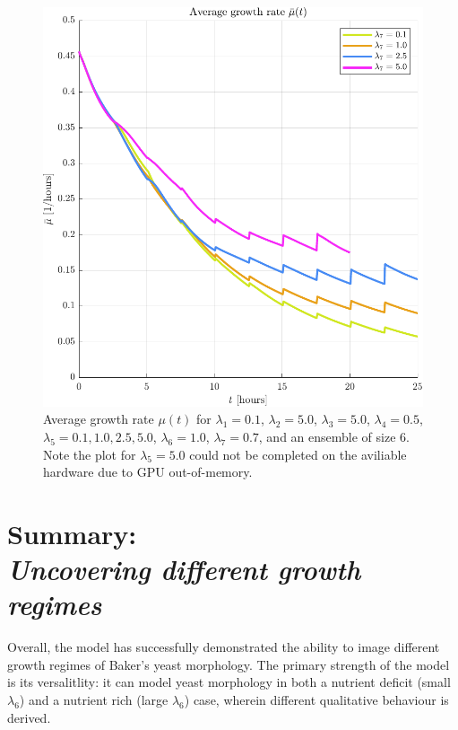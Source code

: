 \begin{figure}[!htb] %
    \centering
    \includegraphics[width= \textwidth]{
        chapter3/figures/Average_mu_EnsembleSize_6o0_L1_0o10_L2_5o00_L3_5o00_L4_0o50_L5_0o10_L6_1o00_L7_0o70.pdf}
    \caption{Average growth rate $\mu(t)$ for 
             $\lambda_1 = 0.1$,  
             $\lambda_2 = 5.0$, 
             $\lambda_3 = 5.0$, 
             $\lambda_4 = 0.5$, 
             $\lambda_5 = 0.1, 1.0, 2.5, 5.0$, 
             $\lambda_6 = 1.0$, 
             $\lambda_7 = 0.7$, and an ensemble of size $6$. Note the plot 
             for $\lambda_5 = 5.0$ could not be completed on the aviliable hardware
             due to GPU out-of-memory.}
    \label{fig:averageMuComparison_varyMobility}
\end{figure}


\section{Summary: \\ \textit{Uncovering different growth regimes}}

Overall, the model has successfully demonstrated the ability 
to image different growth regimes of Baker's yeast morphology.
The primary strength of the model is its versalitlity:
it can model yeast morphology in both a nutrient deficit (small $\lambda_6$)
and a nutrient rich (large $\lambda_6$) case, wherein 
different qualitative behaviour is derived. 
\\

